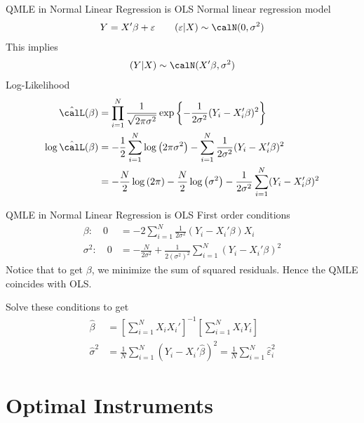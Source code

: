 \documentclass[aspectratio=169, handout]{beamer}
\newcommand{\sumiN}{\sum^N_{i=1}}
\newcommand{\prodiN}{\prod^N_{i=1}}
\begin{document}
\begin{frame}[shrink]{QMLE in Normal Linear Regression is OLS}
Normal linear regression model
\begin{align*}
  Y = X'\beta + \varepsilon
  \qquad
  (\varepsilon|X)
  \sim
  \calN(0,\sigma^2)
\end{align*}
This implies
\begin{align*}
  (Y|X)
  \sim
  \calN(X'\beta,\sigma^2)
\end{align*}
Log-Likelihood
\begin{align*}
  \hat{\calL}(\beta)
  &=
  \prodiN
  \frac{1}{\sqrt{2\pi\sigma^2}}
  \exp\left\{
    -\frac{1}{2\sigma^2}
    (Y_i-X_i'\beta)^2
  \right\}
  \\
  \log
  \hat{\calL}(\beta)
  &=
  - \frac{1}{2}
  \sumiN
  \log\left(
  2\pi\sigma^2
  \right)
  -
  \sumiN
  \frac{1}{2\sigma^2}
  (Y_i-X_i'\beta)^2
  \\
  &=
  - \frac{N}{2}
  \log\left(
  2\pi
  \right)
  - \frac{N}{2}
  \log\left(
  \sigma^2
  \right)
  -
  \frac{1}{2\sigma^2}
  \sumiN
  (Y_i-X_i'\beta)^2
\end{align*}
\end{frame}


\begin{frame}[shrink]{QMLE in Normal Linear Regression is OLS}
First order conditions
\begin{align*}
  \beta:\quad
  0
  &=
  -2
  \sumiN
  \frac{1}{2\sigma^2}
  (Y_i-X_i'\beta)
  X_i
  \\
  \sigma^2:\quad
  0
  &=
  - \frac{N}{2\sigma^2}
  +
  \frac{1}{2(\sigma^2)^2}
  \sumiN
  (Y_i-X_i'\beta)^2
\end{align*}
Notice that to get $\beta$, we minimize the sum of squared residuals.
Hence the QMLE coincides with OLS.

Solve these conditions to get
\begin{align*}
  \hat{\beta}
  &=
  \left[
  \sumiN
  X_iX_i'
  \right]^{-1}
  \left[
  \sumiN
  X_iY_i
  \right]
  \\
  \hat{\sigma}^2
  &=
  \frac{1}{N}
  \sumiN
  (Y_i-X_i'\hat{\beta})^2
  =
  \frac{1}{N}
  \sumiN
  \hat{\varepsilon}_i^2
\end{align*}

\end{frame}





\section{Optimal Instruments}
\end{document}
